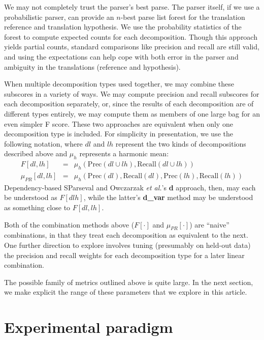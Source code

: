 \documentclass{kluwer}    %
\newcommand{\precision}[1]{\ensuremath{\textrm{Prec}\left(#1\right)}}
\newcommand{\recall}[1]{\ensuremath{\textrm{Recall}\left(#1\right)}}
\begin{document}
\begin{article}
We may not completely trust the parser's best parse.  The parser
itself, if we use a probabilistic parser, can provide an $n$-best
parse list forest for the translation reference and translation
hypothesis. We use the probability statistics of the forest to compute
expected counts for each decomposition. Though this approach yields
partial counts, standard comparisons like precision and recall are
still valid, and using the expectations can help cope with both error
in the parser and ambiguity in the translations (reference and
hypothesis).

When multiple decomposition types used together, we may combine these
subscores in a variety of ways.  We may compute precision and recall
subscores for each decomposition separately, or, since the results of
each decomposition are of different types entirely, we may compute
them as members of one large bag for an even simpler F score.  These
two approaches are equivalent when only one decomposition type is
included.  For simplicity in presentation, we use the following
notation, where $dl$ and $lh$ represent the two kinds of
decompositions described above and $\mu_h$ represents a harmonic mean:
\begin{eqnarray}
  \label{eq:fprmeans}
  F[dl,lh] & = &
  \mu_h \left( \precision{dl \cup lh},
    \recall{dl \cup lh} \right) \\
  \mu_{PR}[dl,lh]  & = & \mu_h \left( \precision{dl},
    \recall{dl}, \precision{lh}, \recall{lh} \right)    
\end{eqnarray}
Dependency-based SParseval and Owczarzak \textit{et al.}'s
\cite*{owczarzak07labelleddepseval} \textbf{d} approach, then, may
each be understood as $F[dlh]$, while the latter's \textbf{d\_var}
method may be understood as something close to $F[dl,lh]$.

Both of the combination methods above ($F[\cdot]$ and
$\mu_{PR}[\cdot]$) are ``naive'' combinations, in that they treat each
decomposition as equivalent to the next.  One further direction to
explore involves tuning (presumably on held-out data) the precision
and recall weights for each decomposition type for a later linear
combination.

The possible family of metrics outlined above is quite large. In the
next section, we make explicit the range of these parameters that we
explore in this article.


\section{Experimental paradigm}
\label{sec:paradigm}


\end{article}
\end{document}
